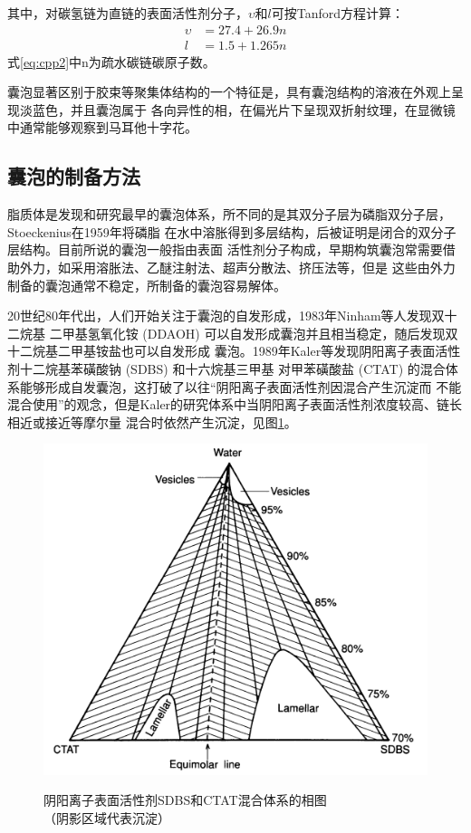 \documentclass[bachelor,winfonts,replaceperiod]{jnuthesis}
\begin{document}
    其中，对碳氢链为直链的表面活性剂分子，$\upsilon$和$l$可按Tanford方程计算：
    \begin{align}\label{eq:cpp2}
        \upsilon &= 27.4+26.9n\\
        l &= 1.5+1.265n
    \end{align}
    式\ref{eq:cpp2}中n为疏水碳链碳原子数。
    
    囊泡显著区别于胶束等聚集体结构的一个特征是，具有囊泡结构的溶液在外观上呈现淡蓝色，并且囊泡属于
    各向异性的相，在偏光片下呈现双折射纹理，在显微镜中通常能够观察到马耳他十字花\cite{刘洪国2016}。
        
    \subsection{囊泡的制备方法}
    脂质体是发现和研究最早的囊泡体系，所不同的是其双分子层为磷脂双分子层，Stoeckenius在1959年将磷脂
    在水中溶胀得到多层结构\cite{刘洪国2016}，后被证明是闭合的双分子层结构。目前所说的囊泡一般指由表面
    活性剂分子构成，早期构筑囊泡常需要借助外力，如采用溶胀法、乙醚注射法、超声分散法、挤压法等，但是
    这些由外力制备的囊泡通常不稳定，所制备的囊泡容易解体\cite{刘洪国2016}。
    
    20世纪80年代出，人们开始关注于囊泡的自发形成，1983年Ninham等人\cite{ninham1983}发现双十二烷基
    二甲基氢氧化铵 (DDAOH) 可以自发形成囊泡并且相当稳定，随后发现双十二烷基二甲基铵盐也可以自发形成
    囊泡。1989年Kaler等\cite{kaler1989}发现阴阳离子表面活性剂十二烷基苯磺酸钠 (SDBS) 和十六烷基三甲基
    对甲苯磺酸盐 (CTAT) 的混合体系能够形成自发囊泡，这打破了以往“阴阳离子表面活性剂因混合产生沉淀而
    不能混合使用”的观念，但是Kaler的研究体系中当阴阳离子表面活性剂浓度较高、链长相近或接近等摩尔量
    混合时依然产生沉淀，见图\ref{fig:vesicle-phase}。    
    \begin{figure}[htbp]
        \centering
        \includegraphics[width= .526\textwidth]{figure/vesicle-phase.png}\\
        \caption{阴阳离子表面活性剂SDBS和CTAT混合体系的相图\cite{kaler1989}\\{\footnotesize{（阴影区域代表沉淀）}}}
        \label{fig:vesicle-phase}
    \end{figure}
\end{document}
